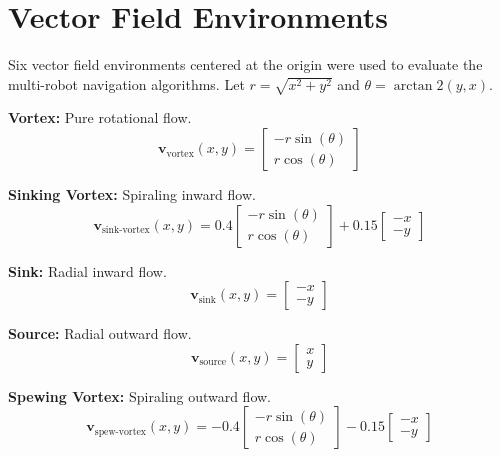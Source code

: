 \documentclass[lettersize,journal]{IEEEtran}
\begin{document}
\appendices

\section{Vector Field Environments}
\label{sec:appendix_vector_fields}

Six vector field environments centered at the origin were used to evaluate the multi-robot navigation algorithms. Let $r = \sqrt{x^2 + y^2}$ and $\theta = \arctan2(y, x)$.

\textbf{Vortex:} Pure rotational flow.
\begin{equation}
\mathbf{v}_{\text{vortex}}(x, y) = \begin{bmatrix} -r \sin(\theta) \\ r \cos(\theta) \end{bmatrix}
\end{equation}

\textbf{Sinking Vortex:} Spiraling inward flow.
\begin{equation}
\mathbf{v}_{\text{sink-vortex}}(x, y) = 0.4 \begin{bmatrix} -r \sin(\theta) \\ r \cos(\theta) \end{bmatrix} + 0.15 \begin{bmatrix} -x \\ -y \end{bmatrix}
\end{equation}

\textbf{Sink:} Radial inward flow.
\begin{equation}
\mathbf{v}_{\text{sink}}(x, y) = \begin{bmatrix} -x \\ -y \end{bmatrix}
\end{equation}

\textbf{Source:} Radial outward flow.
\begin{equation}
\mathbf{v}_{\text{source}}(x, y) = \begin{bmatrix} x \\ y \end{bmatrix}
\end{equation}

\textbf{Spewing Vortex:} Spiraling outward flow.
\begin{equation}
\mathbf{v}_{\text{spew-vortex}}(x, y) = -0.4 \begin{bmatrix} -r \sin(\theta) \\ r \cos(\theta) \end{bmatrix} - 0.15 \begin{bmatrix} -x \\ -y \end{bmatrix}
\end{equation}
\end{document}
